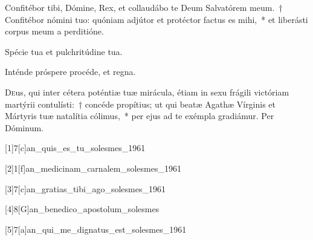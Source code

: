 \documentclass[vesperale_romanum.tex]{subfiles}
\begin{document}
\myrule


\duplex





\lettrine{C}{o}nfitébor tibi, Dómine, Rex, et collaudábo te Deum Salvatórem meum.~† Confitébor nómini tuo: quóniam adjútor et protéctor factus es mihi,~* et liberásti corpus meum a perditióne.


\vv Spécie tua et pulchritúdine tua.

\rr Inténde próspere procéde, et regna.

\label{an_stans_beata_agatha_solesmes_1961}


\oratio

\lettrine{D}{e}us, qui inter cétera poténtiæ tuæ mirácula, étiam in sexu frágili victóriam martýrii contulísti:~† concéde propítius; ut qui beatæ Agathæ Vírginis et Mártyris tuæ natalítia cólimus,~* per ejus ad te exémpla gradiámur. Per Dóminum.



[1]{7}[c]{an_quis_es_tu_solesmes_1961}

[2]{1}[f]{an_medicinam_carnalem_solesmes_1961} 

[3]{7}[c]{an_gratias_tibi_ago_solesmes_1961}

[4]{8}[G]{an_benedico_apostolum_solesmes}

[5]{7}[a]{an_qui_me_dignatus_est_solesmes_1961}
\end{document}
